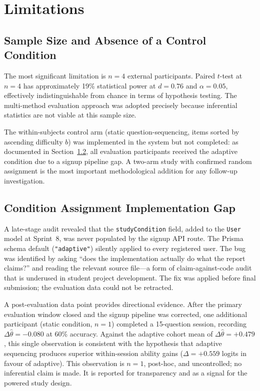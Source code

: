 \section{Limitations}
\label{sec:disc_limitations}

\subsection{Sample Size and Absence of a Control Condition}
\label{subsec:disc_n4}

The most significant limitation is $n = 4$ external participants. Paired
$t$-test at $n = 4$ has approximately 19\% statistical power at $d = 0.76$
and $\alpha = 0.05$, effectively indistinguishable from chance in terms of
hypothesis testing. The multi-method evaluation approach was adopted precisely
because inferential statistics are not viable at this sample size.

The within-subjects control arm (static question-sequencing, items sorted by
ascending difficulty $b$) was implemented in the system but not completed:
as documented in Section~\ref{subsec:disc_condition_gap}, all evaluation
participants received the adaptive condition due to a signup pipeline gap.
A two-arm study with confirmed random assignment is the most important
methodological addition for any follow-up investigation.

\subsection{Condition Assignment Implementation Gap}
\label{subsec:disc_condition_gap}

A late-stage audit revealed that the \texttt{studyCondition} field, added to
the \texttt{User} model at Sprint~8, was never populated by the signup API
route. The Prisma schema default (\texttt{"adaptive"}) silently applied to
every registered user. The bug was identified by asking ``does the
implementation actually do what the report claims?'' and reading the relevant
source file---a form of claim-against-code audit that is underused in student
project development. The fix was applied before final submission; the evaluation
data could not be retracted.

A post-evaluation data point provides directional evidence. After the primary
evaluation window closed and the signup pipeline was corrected, one additional
participant (static condition, $n = 1$) completed a 15-question session,
recording $\Delta\hat{\theta} = -0.080$ at 60\% accuracy. Against the adaptive
cohort mean of $\Delta\hat{\theta} = +0.479$, this single observation is
consistent with the hypothesis that adaptive sequencing produces superior
within-session ability gains ($\Delta = +0.559$ logits in favour of adaptive).
This observation is $n = 1$, post-hoc, and uncontrolled; no inferential
claim is made. It is reported for transparency and as a signal for the
powered study design.

